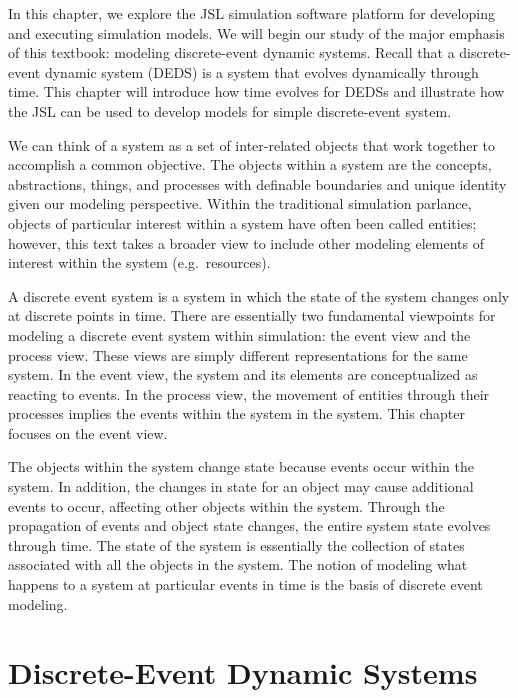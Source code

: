 \documentclass[
]{book}
\theoremstyle{definition}
\theoremstyle{definition}
\theoremstyle{definition}
\theoremstyle{definition}
\theoremstyle{remark}
\begin{document}
In this chapter, we explore the JSL simulation software platform for
developing and executing simulation models. We will begin our study of
the major emphasis of this textbook: modeling discrete-event dynamic
systems. Recall that a discrete-event dynamic system (DEDS) is a system
that evolves dynamically through time. This chapter will introduce how
time evolves for DEDSs and illustrate how the JSL can be used to develop
models for simple discrete-event system.

We can think of a system as a set of inter-related objects that work
together to accomplish a common objective. The objects within a system
are the concepts, abstractions, things, and processes with definable
boundaries and unique identity given our modeling perspective. Within
the traditional simulation parlance, objects of particular interest
within a system have often been called entities; however, this text
takes a broader view to include other modeling elements of interest
within the system (e.g.~resources).

A discrete event system is a system in which the state of the system
changes only at discrete points in time. There are essentially two
fundamental viewpoints for modeling a discrete event system within
simulation: the event view and the process view. These views are simply
different representations for the same system. In the event view, the
system and its elements are conceptualized as reacting to events. In the
process view, the movement of entities through their processes implies
the events within the system in the system. This chapter focuses on the
event view.

The objects within the system change state because events occur within
the system. In addition, the changes in state for an object may cause
additional events to occur, affecting other objects within the system.
Through the propagation of events and object state changes, the entire
system state evolves through time. The state of the system is
essentially the collection of states associated with all the objects in
the system. The notion of modeling what happens to a system at
particular events in time is the basis of discrete event modeling.

\hypertarget{introDEDS:deds}{%
\section{Discrete-Event Dynamic Systems}\label{introDEDS:deds}}
\end{document}
